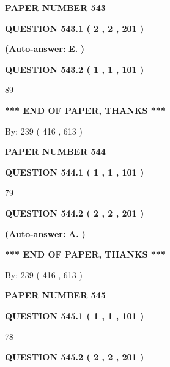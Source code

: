 \documentclass[12pt]{article}
\begin{document}
   
\newpage 
\setcounter{page}{ 
   543001 } 
   
   
 {\textbf{ \Large{ PAPER NUMBER  543  }}}
   
   
   
   
  
  
{\textbf{\large{QUESTION
543.1 
 ( 2 , 2 , 201 )
}}}
 
 
{\textbf{(Auto-answer:}}
{\textbf{\large{
E.}}}
{\textbf{)}}
 
 
  
  
{\textbf{\large{QUESTION
543.2 
 ( 1 , 1 , 101 )
}}}

89
   
   
   
   
\vspace{1.0in} 
{\textbf{\large{ *** END OF PAPER, THANKS *** }}} 
   
   
\hspace{1.0in} By: 
 239 ( 416 ,  613 )
   
   
   
   
\newpage 
\setcounter{page}{ 
   544001 } 
   
   
 {\textbf{ \Large{ PAPER NUMBER  544  }}}
   
   
   
   
  
  
{\textbf{\large{QUESTION
544.1 
 ( 1 , 1 , 101 )
}}}

79
  
  
{\textbf{\large{QUESTION
544.2 
 ( 2 , 2 , 201 )
}}}
 
 
{\textbf{(Auto-answer:}}
{\textbf{\large{
A.}}}
{\textbf{)}}
 
 
   
   
   
   
\vspace{1.0in} 
{\textbf{\large{ *** END OF PAPER, THANKS *** }}} 
   
   
\hspace{1.0in} By: 
 239 ( 416 ,  613 )
   
   
   
   
\newpage 
\setcounter{page}{ 
   545001 } 
   
   
 {\textbf{ \Large{ PAPER NUMBER  545  }}}
   
   
   
   
  
  
{\textbf{\large{QUESTION
545.1 
 ( 1 , 1 , 101 )
}}}

78
  
  
{\textbf{\large{QUESTION
545.2 
 ( 2 , 2 , 201 )
}}}
 
\end{document}
